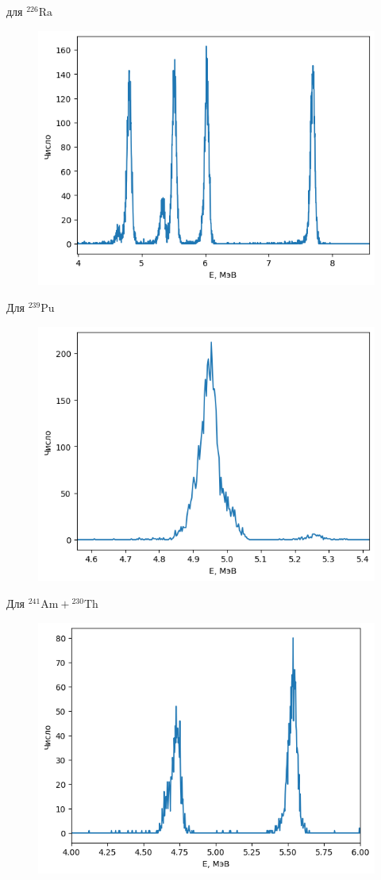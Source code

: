 \documentclass[a4paper, 12pt]{article}
\begin{document}
    для ${ }^{226} \mathrm{Ra}$
    \begin{figure}[H]
        \centering
        \includegraphics[width=0.6\linewidth]{res/4.png}
    \end{figure}

    Для ${ }^{239} \mathrm{Pu}$
    \begin{figure}[H]
        \centering
        \includegraphics[width=0.6\linewidth]{res/6.png}
    \end{figure}
    
    Для ${ }^{241} \mathrm{Am} + { }^{230} \mathrm{Th}$
    \begin{figure}[H]
        \centering
        \includegraphics[width=0.6\linewidth]{res/7.png}
    \end{figure}
\end{document}
